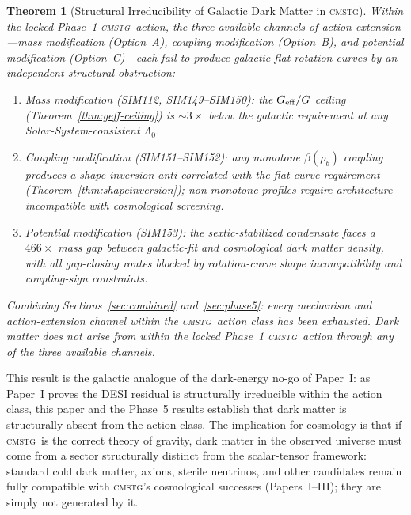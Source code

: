 \documentclass[12pt,a4paper]{article}
\newcommand{\CMSTG}{\textsc{cmstg}}
\newcommand{\Lz}{\Lambda_0}
\newcommand{\Geff}{G_{\rm eff}}
\theoremstyle{plain}
\newtheorem{theorem}{Theorem}
\begin{document}
\begin{theorem}[Structural Irreducibility of Galactic Dark Matter in \CMSTG]
\label{thm:dm-nogo}
Within the locked Phase~1 \CMSTG\ action, the three available channels of
action extension---mass modification (Option~A), coupling modification (Option~B),
and potential modification (Option~C)---each fail to produce galactic flat
rotation curves by an independent structural obstruction:
\begin{enumerate}
  \item \emph{Mass modification} (SIM112, SIM149--SIM150): the $\Geff/G$ ceiling
    (Theorem~\ref{thm:geff-ceiling}) is $\sim3\times$ below the galactic requirement
    at any Solar-System-consistent $\Lz$.
  \item \emph{Coupling modification} (SIM151--SIM152): any monotone $\beta(\rho_b)$
    coupling produces a shape inversion anti-correlated with the flat-curve requirement
    (Theorem~\ref{thm:shapeinversion}); non-monotone profiles require architecture
    incompatible with cosmological screening.
  \item \emph{Potential modification} (SIM153): the sextic-stabilized condensate
    faces a $466\times$ mass gap between galactic-fit and cosmological dark matter
    density, with all gap-closing routes blocked by rotation-curve shape incompatibility
    and coupling-sign constraints.
\end{enumerate}
Combining Sections~\ref{sec:combined} and~\ref{sec:phase5}: every mechanism and
action-extension channel within the \CMSTG\ action class has been exhausted.
Dark matter does not arise from within the locked Phase~1 \CMSTG\ action through
any of the three available channels.
\end{theorem}

This result is the galactic analogue of the dark-energy no-go of Paper~I: as
Paper~I proves the DESI residual is structurally irreducible within the action class,
this paper and the Phase~5 results establish that dark matter is structurally absent
from the action class.  The implication for cosmology is that if \CMSTG\ is the
correct theory of gravity, dark matter in the observed universe must come from a
sector structurally distinct from the scalar-tensor framework: standard cold dark
matter, axions, sterile neutrinos, and other candidates remain fully compatible with
\CMSTG's cosmological successes (Papers~I--III); they are simply not generated by it.

\end{document}
